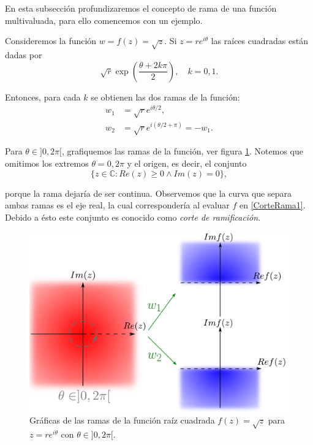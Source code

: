 En esta subsección profundizaremos el concepto de rama de una función multivaluada, para ello comencemos con un ejemplo.

\begin{ejemplo} \label{EjemploRaiz}
Consideremos la función $w = f(z) = \sqrt{z}$. Si $z = r e^{i\theta}$ las raíces cuadradas están dadas por
$$\sqrt{r} \exp \left(\frac{\theta + 2k\pi}{2} \right), \quad k = 0,1.$$

Entonces, para cada $k$ se obtienen las dos ramas de la función:
\begin{align*}
    w_1 &= \sqrt{r} e^{i \theta/2}, \\
    w_2 &= \sqrt{r} e^{i (\theta/2 + \pi)} = -w_1.
\end{align*}

Para $\theta \in ]0, 2\pi[$, grafiquemos las ramas de la función, ver figura \ref{fig:Raiz1}. Notemos que omitimos los extremos $\theta = 0,2\pi$ y el origen, es decir, el conjunto
\begin{equation}
\{ z \in \mathbb{C} : Re(z) \geq 0 \wedge Im(z) = 0\},    \label{CorteRama1}
\end{equation}

porque la rama dejaría de ser continua. Observemos que la curva que separa ambas ramas es el eje real, la cual correspondería al evaluar $f$ en \eqref{CorteRama1}. Debido a ésto este conjunto es conocido como \textit{corte de ramificación}.

\begin{figure}[H]
    \centering
    \includegraphics[scale = 0.5]{Figuras/RaizCuadrada1.pdf}
    \caption{Gráficas de las ramas de la función raíz cuadrada $f(z) = \sqrt{z}$ para $z = r e^{i\theta}$ con $\theta \in ]0,2\pi[$.}
    \label{fig:Raiz1}
\end{figure}


\end{ejemplo}
